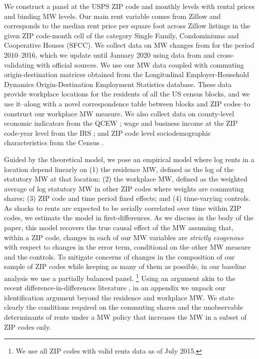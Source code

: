 We construct a panel at the USPS ZIP code and monthly levels with rental prices 
and binding MW levels.
Our main rent variable comes from Zillow and corresponds to the median 
rent price per square foot across Zillow listings in the given ZIP 
code-month cell of the category Single Family, Condominiums and Cooperative 
Houses (SFCC).
We collect data on MW changes from \textcite{VaghulZipperer2016} for the period 
2010--2016, which we update until January 2020 using data from 
\textcite{BerkeleyLaborCenter} and cross-validating with official sources.
We use our MW data coupled with commuting origin-destination matrices obtained 
from the Longitudinal Employer-Household Dynamics Origin-Destination Employment 
Statistics \parencite[LODES;][]{CensusLODES} database.
These data provide workplace locations for the residents of all the US census 
blocks, and we use it--along with a novel correspondence table between blocks 
and ZIP codes--to construct our workplace MW measure.
We also collect data on 
county-level economic indicators from the QCEW \parencite{QCEW}; 
wage and business income at the ZIP code-year level from the IRS \parencite{IRS}; and 
ZIP code level sociodemographic characteristics from the Census 
\parencite{CensusDecennial, CensusACS}.


Guided by the theoretical model, we pose an empirical model where log rents in 
a location depend linearly on
(1) the residence MW, defined as the log of the statutory MW at that location;
(2) the workplace MW, defined as the weighted average of log statutory MW in other 
ZIP codes where weights are commuting shares;
(3) ZIP code and time period fixed effects;
and 
(4) time-varying controls.
As shocks to rents are expected to be serially correlated over time within ZIP 
codes, we estimate the model in first-differences.
As we discuss in the body of the paper, this model recovers the true causal 
effect of the MW assuming that, within a ZIP code, changes in each of our MW 
variables are \textit{strictly exogenous} with respect to changes in the error 
term, conditional on the other MW measure and the controls.
To mitigate concerns of changes in the composition of our sample of ZIP codes 
while keeping as many of them as possible, in our baseline analysis we use a 
partially balanced panel.%
\footnote{We use all ZIP codes with valid rents data as of July 2015.}
Using an argument akin to the recent difference-in-differences literature
\parencite[e.g.,][]{CallawayEtAl2021}, 
in an appendix we unpack our identification argument beyond the residence and
workplace MW. 
We state clearly the conditions required on the commuting shares and the 
unobservable determinants of rents under a MW policy that increases the MW in 
a subset of ZIP codes only.

